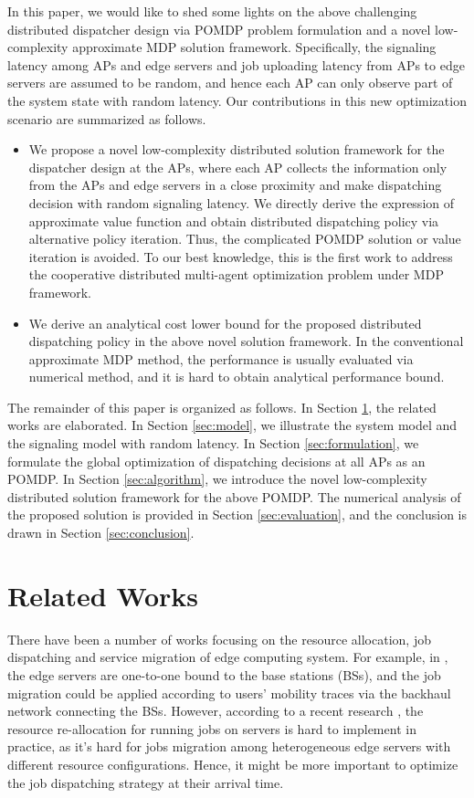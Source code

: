 In this paper, we would like to shed some lights on the above challenging distributed dispatcher design via POMDP problem formulation and a novel low-complexity approximate MDP solution framework.
Specifically, the signaling latency among APs and edge servers and job uploading latency from APs to edge servers are assumed to be random, and hence each AP can only observe part of the system state with random latency.
Our contributions in this new optimization scenario are summarized as follows.
\begin{itemize}
    \item We propose a novel low-complexity distributed solution framework for the dispatcher design at the APs, where each AP collects the information only from the APs and edge servers in a close proximity and make dispatching decision with random signaling latency. We directly derive the expression of approximate value function and obtain distributed dispatching policy via alternative policy iteration. Thus, the complicated POMDP solution or value iteration is avoided. To our best knowledge, this is the first work to address the cooperative distributed multi-agent optimization problem under MDP framework.
    \item We derive an analytical cost lower bound for the proposed distributed dispatching policy in the above novel solution framework. In the conventional approximate MDP method, the performance is usually evaluated via numerical method, and it is hard to obtain analytical performance bound.
\end{itemize}

The remainder of this paper is organized as follows.
In Section \ref{sec:review}, the related works are elaborated.
In Section \ref{sec:model}, we illustrate the system model and the signaling model with random latency.
In Section \ref{sec:formulation}, we formulate the global optimization of dispatching decisions at all APs as an POMDP.
In Section \ref{sec:algorithm}, we introduce the novel low-complexity distributed solution framework for the above POMDP.
The numerical analysis of the proposed solution is provided in Section \ref{sec:evaluation}, and the conclusion is drawn in Section \ref{sec:conclusion}.

\section{Related Works}
\label{sec:review}
There have been a number of works focusing on the resource allocation, job dispatching and service migration of edge computing system.
For example, in \cite{TON19-WangSq}, the edge servers are one-to-one bound to the base stations (BSs), and the job migration could be applied according to users' mobility traces via the backhaul network connecting the BSs.
However, according to a recent research \cite{INFOCOM19-WuC}, the resource re-allocation for running jobs on servers is hard to implement in practice, as it's hard for jobs migration among heterogeneous edge servers with different resource configurations.
Hence, it might be more important to optimize the job dispatching strategy at their arrival time.

